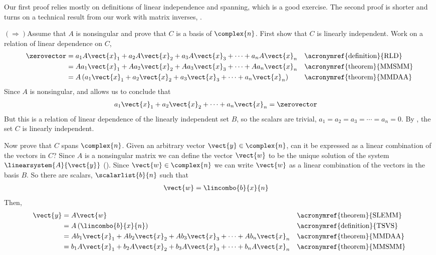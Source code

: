 Our first proof relies mostly on definitions of linear independence and spanning, which is a good exercise.  The second proof is shorter and turns on a technical result from our work with matrix inverses, .\par
%
$\left(\Rightarrow\right)$\quad  Assume that $A$ is nonsingular and prove that $C$ is a basis of $\complex{n}$.  First show that $C$ is linearly independent.  Work on a relation of linear dependence on $C$,
%
\begin{align*}
\zerovector
&=
a_1A\vect{x}_1+
a_2A\vect{x}_2+
a_3A\vect{x}_3+
\cdots+
a_nA\vect{x}_n
&&\text{\acronymref{definition}{RLD}}\\
%
&=
Aa_1\vect{x}_1+
Aa_2\vect{x}_2+
Aa_3\vect{x}_3+
\cdots+
Aa_n\vect{x}_n
&&\text{\acronymref{theorem}{MMSMM}}\\
%
&=
A\left(
a_1\vect{x}_1+
a_2\vect{x}_2+
a_3\vect{x}_3+
\cdots+
a_n\vect{x}_n
\right)
&&\text{\acronymref{theorem}{MMDAA}}
\end{align*}
%
Since $A$ is nonsingular,  and  allows us to conclude that 
%
\begin{align*}
a_1\vect{x}_1+
a_2\vect{x}_2+
\cdots+
a_n\vect{x}_n
&=\zerovector
\end{align*}
%
But this is a relation of linear dependence of the linearly independent set $B$, so the scalars are trivial, $a_1=a_2=a_3=\cdots=a_n=0$.  By , the set $C$ is linearly independent.\par
%
Now prove that $C$ spans $\complex{n}$.  Given an arbitrary vector $\vect{y}\in\complex{n}$, can it be expressed as a linear combination of the vectors in $C$?  Since $A$ is a nonsingular matrix we can define the vector $\vect{w}$ to be the unique solution of the system $\linearsystem{A}{\vect{y}}$ ().  Since $\vect{w}\in\complex{n}$ we can write $\vect{w}$ as a linear combination of the vectors in the basis $B$.  So there are scalars, $\scalarlist{b}{n}$ such that
%
\begin{align*}
\vect{w}&=\lincombo{b}{x}{n}
\end{align*}
%
Then,
%
\begin{align*}
\vect{y}
&=A\vect{w}
&&\text{\acronymref{theorem}{SLEMM}}\\
&=A\left(\lincombo{b}{x}{n}\right)
&&\text{\acronymref{definition}{TSVS}}\\
%
&=
Ab_1\vect{x}_1+
Ab_2\vect{x}_2+
Ab_3\vect{x}_3+
\cdots+
Ab_n\vect{x}_n
&&\text{\acronymref{theorem}{MMDAA}}\\
%
&=
b_1A\vect{x}_1+
b_2A\vect{x}_2+
b_3A\vect{x}_3+
\cdots+
b_nA\vect{x}_n
&&\text{\acronymref{theorem}{MMSMM}}
%
\end{align*}
